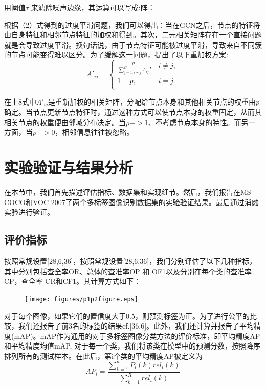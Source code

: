 用阈值$\tau$ 来滤除噪声边缘，其运算可以写成:阵：

根据（2）式得到的过度平滑问题，我们可以得出：当在GCN之后，节点的特征将由自身特征和相邻节点特征的加权和得到。其次，二元相关矩阵存在一个直接问题就是会导致过度平滑。换句话说，由于节点特征可能被过度平滑，导致来自不同簇的节点可能变得难以区分\cite{Jiang2016CNN}。为了缓解这一问题，提出了以下重加权方案:
\begin{equation}
A'_{ij} =\left\{
\begin{array}{lr}
\frac{p}{\sum_{j=1,i\neq j}^C A_{ij}}, & i\neq j, \\
1-p, & i=j. \\
\end{array}
\right. 
\label{con:Gamma_n}
\end{equation}

在上8式中$A'_{ij}$是重新加权的相关矩阵，分配给节点本身和其他相关节点的权重由$p$确定。当节点更新节点特征时，通过这种方式可以使节点本身的权重固定，从而其相关节点的权重便由邻域分布决定。当$p->1$、不考虑节点本身的特性。而另一方面，当$p->0$，相邻信息往往被忽略。


\chapter{实验验证与结果分析}
在本节中，我们首先描述评估指标、数据集和实现细节。然后，我们报告在MS-COCO\cite{Jiang2016CNN}和VOC 2007\cite{Zhang2007ML}了两个多标签图像识别数据集的实验验证结果。最后通过消融实验进行验证。

\section{评价指标}
按照常规设置[28,6,36]，按照常规设置[28,6,36]，我们分别评估了以下几种指标，其中分别包括查全率OR、总体的查准率OP 和 OF1以及分别在每个类的查准率CP，查全率 CR和CF1。其计算方式如下：

\begin{figure}[htbp!]
	\centering
	\texttt{[image: figures/p1p2figure.eps]}
	\vspace{-1em}
\end{figure}

对于每个图像，如果它们的置信度大于0.5，则预测标签为正。为了进行公平的比较，我们还报告了前3名的标签的结果cf.[36,6]。此外，我们还计算并报告了平均精度(mAP)。mAP作为通用的对于多标签图像分类方法的评价标准，即平均精度AP和平均精度均值mAP, 对于每一个类，我们将该类在模型中的预测分数，按照降序排列所有的测试样本。在此后，第i个类的平均精度AP被定义为
\begin{equation}
\label{dscNoStgProof0}
AP_i = \frac{\sum_{k=1}^{p}P_i(k)rel_i(k)}{\sum_{k=1}^{R}rel_i(k)}
\end{equation}

